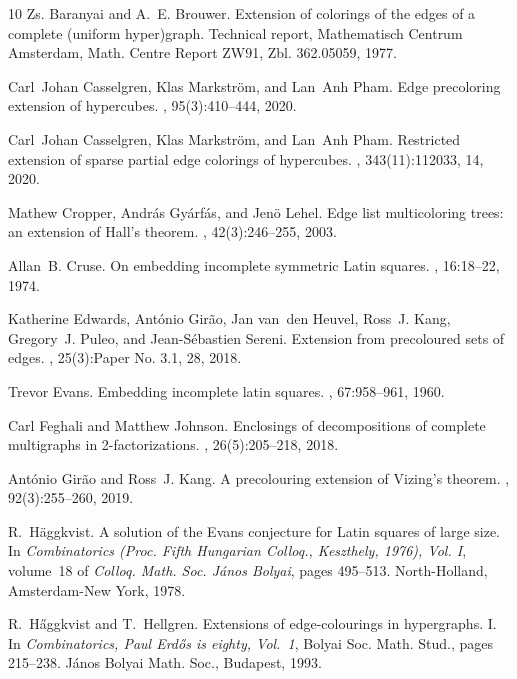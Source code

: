 \documentclass[12pt,oneside]{amsart}
\begin{document}
\begin{thebibliography}{10}
Zs. Baranyai and A.~E. Brouwer.
\newblock Extension of colorings of the edges of a complete (uniform
  hyper)graph.
\newblock Technical report, Mathematisch Centrum Amsterdam, Math. Centre Report
  ZW91, Zbl. 362.05059, 1977.

Carl~Johan Casselgren, Klas Markstr\"{o}m, and Lan~Anh Pham.
\newblock Edge precoloring extension of hypercubes.
, 95(3):410--444, 2020.

Carl~Johan Casselgren, Klas Markstr\"{o}m, and Lan~Anh Pham.
\newblock Restricted extension of sparse partial edge colorings of hypercubes.
, 343(11):112033, 14, 2020.

Mathew Cropper, Andr\'{a}s Gy\'{a}rf\'{a}s, and Jen\"{o} Lehel.
\newblock Edge list multicoloring trees: an extension of {H}all's theorem.
, 42(3):246--255, 2003.

Allan~B. Cruse.
\newblock On embedding incomplete symmetric {L}atin squares.
, 16:18--22, 1974.

Katherine Edwards, Ant\'{o}nio Gir\~{a}o, Jan van~den Heuvel, Ross~J. Kang,
  Gregory~J. Puleo, and Jean-S\'{e}bastien Sereni.
\newblock Extension from precoloured sets of edges.
, 25(3):Paper No. 3.1, 28, 2018.

Trevor Evans.
\newblock Embedding incomplete latin squares.
, 67:958--961, 1960.

Carl Feghali and Matthew Johnson.
\newblock Enclosings of decompositions of complete multigraphs in
  2-factorizations.
, 26(5):205--218, 2018.

Ant\'{o}nio Gir\~{a}o and Ross~J. Kang.
\newblock A precolouring extension of {V}izing's theorem.
, 92(3):255--260, 2019.

R.~H\"{a}ggkvist.
\newblock A solution of the {E}vans conjecture for {L}atin squares of large
  size.
\newblock In {\em Combinatorics ({P}roc. {F}ifth {H}ungarian {C}olloq.,
  {K}eszthely, 1976), {V}ol. {I}}, volume~18 of {\em Colloq. Math. Soc.
  J\'{a}nos Bolyai}, pages 495--513. North-Holland, Amsterdam-New York, 1978.

R.~H{\H a}ggkvist and T.~Hellgren.
\newblock Extensions of edge-colourings in hypergraphs. {I}.
\newblock In {\em Combinatorics, {P}aul {E}rd{\H o}s is eighty, {V}ol.\ 1},
  Bolyai Soc. Math. Stud., pages 215--238. J\'anos Bolyai Math. Soc., Budapest,
  1993.


\end{thebibliography}
\end{document}
